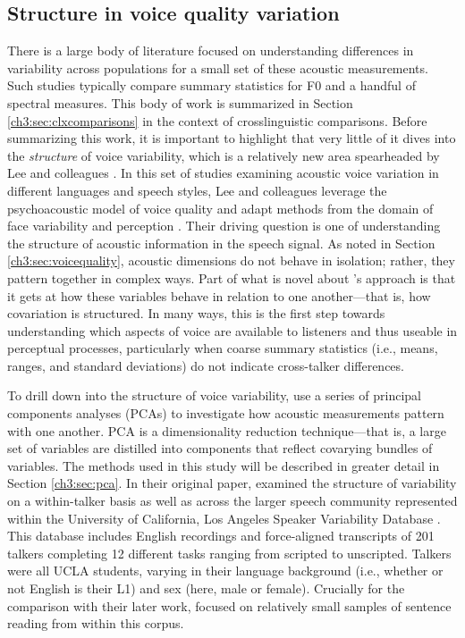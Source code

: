 \subsection{Structure in voice quality variation}\label{ch3:sec:voicestructure}

There is a large body of literature focused on understanding differences in variability across populations for a small set of these acoustic measurements. Such studies typically compare summary statistics for F0 and a handful of spectral measures. This body of work is summarized in Section \ref{ch3:sec:clxcomparisons} in the context of crosslinguistic comparisons. Before summarizing this work, it is important to highlight that very little of it dives into the \textit{structure} of voice variability, which is a relatively new area spearheaded by Lee and colleagues \citep{lee_2019_acoustic, lee_2019_spontaneous, lee_2020_language}. In this set of studies examining acoustic voice variation in different languages and speech styles, Lee and colleagues leverage the psychoacoustic model of voice quality \citep{kreiman_2014_theory} and adapt methods from the domain of face variability and perception \citep{burton_2016_faces}. Their driving question is one of understanding the structure of acoustic information in the speech signal. As noted in Section \ref{ch3:sec:voicequality}, acoustic dimensions do not behave in isolation; rather, they pattern together in complex ways. Part of what is novel about \citeauthor{lee_2019_acoustic}'s approach is that it gets at how these variables behave in relation to one another---that is, how covariation is structured. In many ways, this is the first step towards understanding which aspects of voice are available to listeners and thus useable in perceptual processes, particularly when coarse summary statistics (i.e., means, ranges, and standard deviations) do not indicate cross-talker differences. 

To drill down into the structure of voice variability, \citet{lee_2019_acoustic} use a series of principal components analyses (PCAs) to investigate how acoustic measurements pattern with one another. PCA is a dimensionality reduction technique---that is, a large set of variables are distilled into components that reflect covarying bundles of variables. The methods used in this study will be described in greater detail in Section \ref{ch3:sec:pca}. In their original paper, \citet{lee_2019_acoustic} examined the structure of variability on a within-talker basis as well as across the larger speech community represented within the University of California, Los Angeles Speaker Variability Database \citep{keating_2019_database}. This database includes English recordings and force-aligned transcripts of 201 talkers completing 12 different tasks ranging from scripted to unscripted. Talkers were all UCLA students, varying in their language background (i.e., whether or not English is their L1) and sex (here, male or female). Crucially for the comparison with their later work, \citet{lee_2019_acoustic} focused on relatively small samples of sentence reading from within this corpus. 

